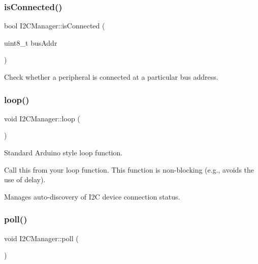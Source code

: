 \subsubsection{\texorpdfstring{is\+Connected()}{isConnected()}}
{\footnotesize\ttfamily bool I2\+C\+Manager\+::is\+Connected (\begin{DoxyParamCaption}\item[{uint8\+\_\+t}]{bus\+Addr }\end{DoxyParamCaption})}

Check whether a peripheral is connected at a particular bus address. \mbox{\label{class_i2_c_manager_aa7cce07ffa6d2e5e7eb0ac9d5d237d69}} 
\subsubsection{\texorpdfstring{loop()}{loop()}}
{\footnotesize\ttfamily void I2\+C\+Manager\+::loop (\begin{DoxyParamCaption}{ }\end{DoxyParamCaption})}



Standard Arduino style {\ttfamily loop} function. 

Call this from your {\ttfamily loop} function. This function is non-\/blocking (e.\+g., avoids the use of {\ttfamily delay}).

Manages auto-\/discovery of I2C device connection status. \mbox{\label{class_i2_c_manager_a54a85fded61d8faab6428e1fc1c90c8f}} 
\subsubsection{\texorpdfstring{poll()}{poll()}}
{\footnotesize\ttfamily void I2\+C\+Manager\+::poll (\begin{DoxyParamCaption}{ }\end{DoxyParamCaption})\hspace{0.3cm}{\ttfamily [private]}}

\mbox{\label{class_i2_c_manager_a0fcbab8677f2abcd3febe6b809f8f062}} 
